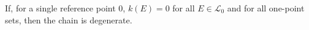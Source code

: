 If, for a single reference point $0$, $k(E) = 0$ for all $E \in \mathcal{L}_0$ and for all one-point sets, then the chain is degenerate.
